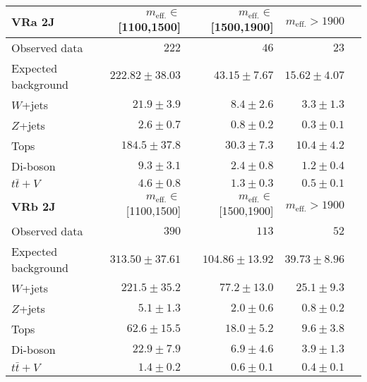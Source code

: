 \begin{table}
  \begin{center}
    \caption{ \label{tab::BGestimation::VRyields_2J}   }
    
    \begin{tabular*}{\textwidth}{@{\extracolsep{\fill}}lrrrr}
      \toprule
      \textbf{VRa 2J} & $m_{\mathrm{eff.}}\in$[1100,1500] & $m_{\mathrm{eff.}}\in$[1500,1900] & $m_{\mathrm{eff.}}>1900$ \\
      \midrule
      
Observed data          & $222$              & $46$              & $23$                    \\
\midrule
Expected background         & $222.82 \pm 38.03$          & $43.15 \pm 7.67$          & $15.62 \pm 4.07$              \\
\midrule
        $W$+jets         & $21.9 \pm 3.9$          & $8.4 \pm 2.6$          & $3.3 \pm 1.3$              \\
        $Z$+jets         & $2.6 \pm 0.7$          & $0.8 \pm 0.2$          & $0.3 \pm 0.1$              \\
        Tops         & $184.5 \pm 37.8$          & $30.3 \pm 7.3$          & $10.4 \pm 4.2$              \\
        Di-boson         & $9.3 \pm 3.1$          & $2.4 \pm 0.8$          & $1.2 \pm 0.4$              \\
        $t\bar{t}+V$         & $4.6 \pm 0.8$          & $1.3 \pm 0.3$          & $0.5 \pm 0.1$              \\
\toprule
\textbf{VRb 2J} & $m_{\mathrm{eff.}}\in$[1100,1500] & $m_{\mathrm{eff.}}\in$[1500,1900] & $m_{\mathrm{eff.}}>1900$ \\
\midrule
Observed data          & $390$              & $113$              & $52$                    \\
\midrule
Expected background         & $313.50 \pm 37.61$          & $104.86 \pm 13.92$          & $39.73 \pm 8.96$              \\
\midrule
        $W$+jets         & $221.5 \pm 35.2$          & $77.2 \pm 13.0$          & $25.1 \pm 9.3$              \\
        $Z$+jets         & $5.1 \pm 1.3$          & $2.0 \pm 0.6$          & $0.8 \pm 0.2$              \\
        Tops         & $62.6 \pm 15.5$          & $18.0 \pm 5.2$          & $9.6 \pm 3.8$              \\
        Di-boson         & $22.9 \pm 7.9$          & $6.9 \pm 4.6$          & $3.9 \pm 1.3$              \\
        $t\bar{t}+V$         & $1.4 \pm 0.2$          & $0.6 \pm 0.1$          & $0.4 \pm 0.1$              \\
        \bottomrule
        \end{tabular*}

  \end{center}
\end{table}



